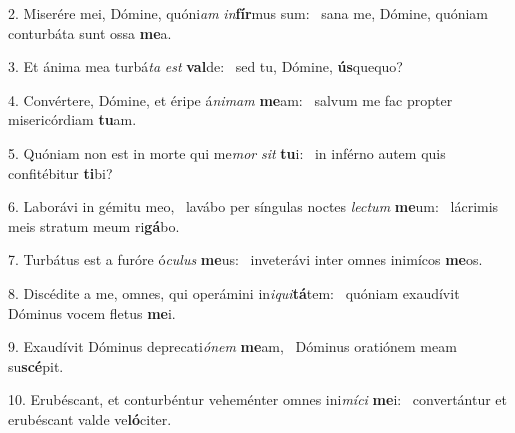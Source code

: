 2. Miserére mei, Dómine, quóni\textit{am} \textit{in}\textbf{fír}mus sum: \ast\  sana me, Dómine, quóniam conturbáta sunt ossa \textbf{me}a.\

3. Et ánima mea turbá\textit{ta} \textit{est} \textbf{val}de: \ast\  sed tu, Dómine, \textbf{ús}quequo?\

4. Convértere, Dómine, et éripe á\textit{ni}\textit{mam} \textbf{me}am: \ast\  salvum me fac propter misericórdiam \textbf{tu}am.\

5. Quóniam non est in morte qui me\textit{mor} \textit{sit} \textbf{tu}i: \ast\  in inférno autem quis confitébitur \textbf{ti}bi?\

6. Laborávi in gémitu meo, \dag\  lavábo per síngulas noctes \textit{lec}\textit{tum} \textbf{me}um: \ast\  lácrimis meis stratum meum ri\textbf{gá}bo.\

7. Turbátus est a furóre ó\textit{cu}\textit{lus} \textbf{me}us: \ast\  inveterávi inter omnes inimícos \textbf{me}os.\

8. Discédite a me, omnes, qui operámini in\textit{i}\textit{qui}\textbf{tá}tem: \ast\  quóniam exaudívit Dóminus vocem fletus \textbf{me}i.\

9. Exaudívit Dóminus deprecati\textit{ó}\textit{nem} \textbf{me}am, \ast\  Dóminus oratiónem meam su\textbf{scé}pit.\

10. Erubéscant, et conturbéntur veheménter omnes ini\textit{mí}\textit{ci} \textbf{me}i: \ast\  convertántur et erubéscant valde ve\textbf{ló}citer.\

